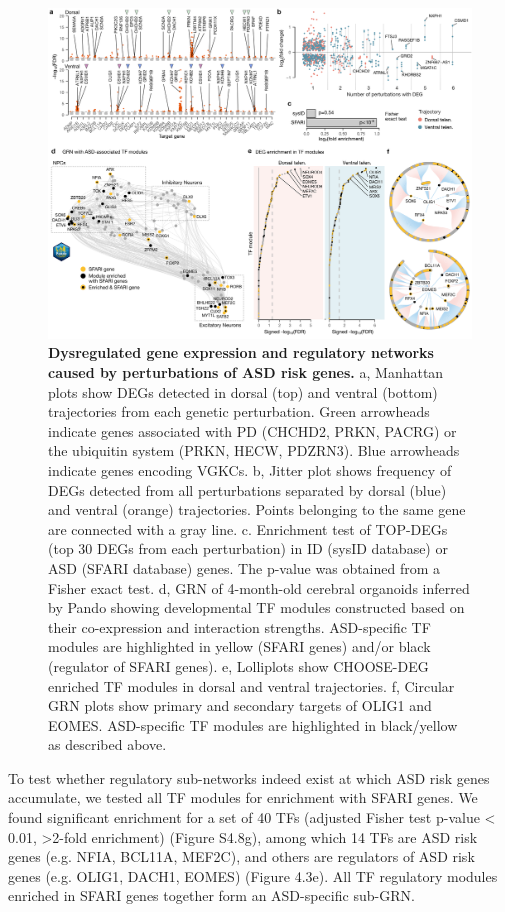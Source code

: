 \begin{figure}[t!]
    \centering
	\includegraphics[width=\textwidth]{figures/asd/Figure_3}
    \caption{\textbf{Dysregulated gene expression and regulatory networks caused by perturbations of ASD risk genes.}
    a, Manhattan plots show DEGs detected in dorsal (top) and ventral (bottom) trajectories from each genetic perturbation. Green arrowheads indicate genes associated with PD (CHCHD2, PRKN, PACRG) or the ubiquitin system (PRKN, HECW, PDZRN3). Blue arrowheads indicate genes encoding VGKCs. b, Jitter plot shows frequency of DEGs detected from all perturbations separated by dorsal (blue) and ventral (orange) trajectories. Points belonging to the same gene are connected with a gray line. c. Enrichment test of TOP-DEGs (top 30 DEGs from each perturbation) in ID (sysID database) or ASD (SFARI database) genes. The p-value was obtained from a Fisher exact test. d, GRN of 4-month-old cerebral organoids inferred by Pando showing developmental TF modules constructed based on their co-expression and interaction strengths. ASD-specific TF modules are highlighted in yellow (SFARI genes) and/or black (regulator of SFARI genes). e, Lolliplots show CHOOSE-DEG enriched TF modules in dorsal and ventral trajectories. f, Circular GRN plots show primary and secondary targets of OLIG1 and EOMES. ASD-specific TF modules are highlighted in black/yellow as described above.}
    \label{fig:asd3}
\end{figure}

To test whether regulatory sub-networks indeed exist at which ASD risk genes accumulate, we tested all TF modules for enrichment with SFARI genes. We found significant enrichment for a set of 40 TFs (adjusted Fisher test p-value < 0.01, >2-fold enrichment) (Figure S4.8g), among which 14 TFs are ASD risk genes (e.g. NFIA, BCL11A, MEF2C), and others are regulators of ASD risk genes (e.g. OLIG1, DACH1, EOMES) (Figure 4.3e). All TF regulatory modules enriched in SFARI genes together form an ASD-specific sub-GRN.

